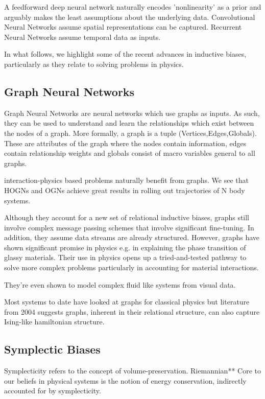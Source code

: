 \documentclass{article}
\begin{document}
A feedforward deep neural network naturally encodes 'nonlinearity' as a prior and arguably makes the least assumptions about the underlying data. Convolutional Neural Networks assume spatial representations can be captured. Recurrent Neural Networks assume temporal data as inputs. 

In what follows, we highlight some of the recent advances in inductive biases, particularly as they relate to solving problems in physics.

\subsection{Graph Neural Networks}

Graph Neural Networks are neural networks which use graphs as inputs. As such, they can be used to understand and learn the relationships which exist between the nodes of a graph. More formally, a graph is a tuple (Vertices,Edges,Globals). These are attributes of the graph where the nodes contain information, edges contain relationship weights and globals consist of macro variables general to all graphs. 

interaction-physics based problems naturally benefit from graphs. We see that HOGNs and OGNs achieve great results in rolling out trajectories of N body systems. 

Although they account for a new set of relational inductive biases, graphs still involve complex message passing schemes that involve significant fine-tuning. In addition, they assume data streams are already structured. However, graphs have shown significant promise in physics e.g. in explaining the phase transition of glassy materials. Their use in physics opens up a tried-and-tested pathway to solve more complex problems particularly in accounting for material interactions. 

They're even shown to model complex fluid like systems from visual data. 

Most systems to date have looked at graphs for classical physics but literature from 2004 suggests graphs, inherent in their relational structure, can also capture Ising-like hamiltonian structure.


\subsection{Symplectic Biases}

Symplecticity refers to the concept of volume-preservation. Riemannian**
Core to our beliefs in physical systems is the notion of energy conservation, indirectly accounted for by symplecticity.
\end{document}
